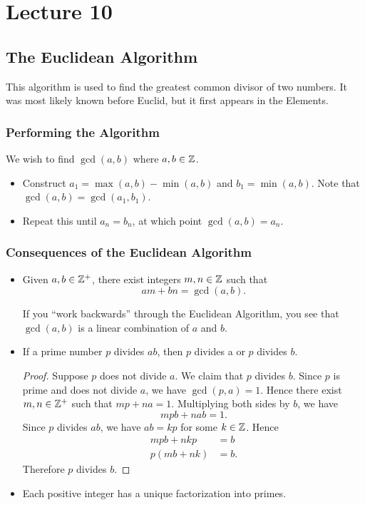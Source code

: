 \documentclass[class=article, crop=false]{standalone}
\begin{document}
  \section{Lecture 10}
  \subsection{The Euclidean Algorithm}
  This algorithm is used to find the greatest common divisor of two numbers. It was most likely known before Euclid, but it first appears in the Elements.
  \subsubsection{Performing the Algorithm}
  We wish to find $\gcd(a, b)$ where $a, b\in \mathbb{Z}$.
  \begin{itemize}
    \item Construct $a_1 = \max(a, b) - \min(a, b)$ and $b_1 = \min(a, b)$. Note that $\gcd(a, b) = \gcd(a_1, b_1)$.
    \item Repeat this until $a_n = b_n$, at which point $\gcd(a, b) = a_n$.
  \end{itemize}
  \subsubsection{Consequences of the Euclidean Algorithm}
  \begin{itemize}
    \item Given $a, b\in \mathbb{Z}^+$, there exist integers $m, n\in\mathbb{Z}$ such that
    \[
      am + bn = \gcd(a, b).
    \]
    \begin{note}{}
      If you ``work backwards'' through the Euclidean Algorithm, you see that $\gcd(a, b)$ is a linear combination of $a$ and $b$.
    \end{note}
    \item If a prime number $p$ divides $ab$, then $p$ divides a or $p$ divides $b$.
    \begin{proof}
      Suppose $p$ does not divide $a$. We claim that $p$ divides $b$. Since $p$ is prime and does not divide $a$, we have $\gcd(p, a) = 1$. Hence there exist $m, n\in \mathbb{Z}^+$ such that $mp + na = 1$. Multiplying both sides by $b$, we have
      \[
        mpb + nab = 1.
      \]
      Since $p$ divides $ab$, we have $ab = kp$ for some $k\in \mathbb{Z}$. Hence
      \begin{align*}
        mpb + nkp &= b \\
        p(mb + nk) &= b.
      \end{align*}
      Therefore $p$ divides $b$.
    \end{proof}
    \item Each positive integer has a unique factorization into primes.
  \end{itemize}
\end{document}
